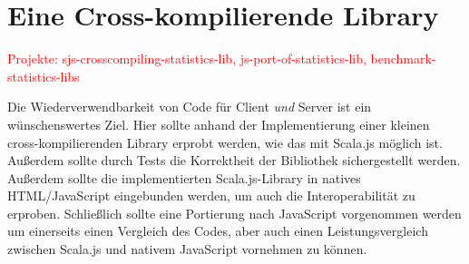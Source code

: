 \documentclass[a4paper, 12pt, hidelinks, listof=totoc, listoftables=totoc, bibliography=totoc]{scrreprt}
\newcommand{\TODO}[1]{\textcolor{red}{#1}\newline}
\begin{document}
%

\section{Eine Cross-kompilierende Library}

\TODO{Projekte: sjs-crosscompiling-statistics-lib, js-port-of-statistics-lib, benchmark-statistics-libs}

Die Wiederverwendbarkeit von Code für Client \emph{und} Server ist ein wünschenswertes Ziel. Hier sollte anhand der Implementierung einer kleinen cross-kompilierenden Library erprobt werden, wie das mit Scala.js möglich ist. Außerdem sollte durch Tests die Korrektheit der Bibliothek sichergestellt werden. Außerdem sollte die implementierten Scala.js-Library in natives HTML/JavaScript eingebunden werden, um auch die Interoperabilität zu erproben. Schließlich sollte eine Portierung nach JavaScript vorgenommen werden um einerseits einen Vergleich des Codes, aber auch einen Leistungsvergleich zwischen Scala.js und nativem JavaScript vornehmen zu können.
\end{document}
